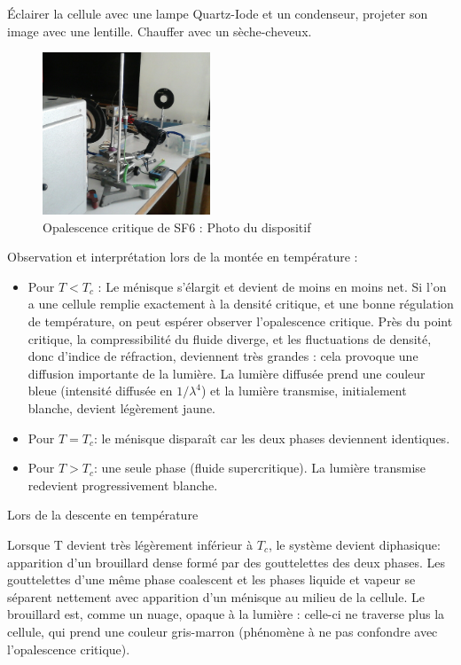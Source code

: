 \documentclass{article}%
\begin{document}
Éclairer la cellule avec une lampe Quartz-Iode et un condenseur, projeter son image avec une lentille. Chauffer avec un sèche-cheveux.
\begin{figure}
	\centerline{\includegraphics[width=5cm]{images-exp/opalescence_critique.jpg}}
	\caption{Opalescence critique de SF6 : Photo du dispositif}
\end{figure}

Observation et interprétation lors de la montée en température :

\begin{itemize}
	\item    Pour $T < T_{c}$ : Le ménisque s'élargit et devient de moins en moins net. Si l'on a une cellule remplie exactement à la densité critique, et une bonne régulation de température, on peut espérer observer l'opalescence critique. Près du point critique, la compressibilité du fluide diverge, et les fluctuations de densité, donc d'indice de réfraction, deviennent très grandes : cela provoque une diffusion importante de la lumière. La lumière diffusée prend une couleur bleue (intensité diffusée en $1/\lambda^{4}$) et la lumière transmise, initialement blanche, devient légèrement jaune.
	\item    Pour $T=T_{c}$: le ménisque disparaît car les deux phases deviennent identiques.
	\item    Pour $T > T_{c}$: une seule phase (fluide supercritique). La lumière transmise redevient progressivement blanche.
\end{itemize}

Lors de la descente en température

Lorsque T devient très légèrement inférieur à $T_{c}$, le système devient diphasique: apparition d'un brouillard dense formé par des gouttelettes des deux phases. Les gouttelettes d'une même phase coalescent et les phases liquide et vapeur se séparent nettement avec apparition d'un ménisque au milieu de la cellule. Le brouillard est, comme un nuage, opaque à la lumière : celle-ci ne traverse plus la cellule, qui prend une couleur gris-marron (phénomène à ne pas confondre avec l'opalescence critique).
\end{document}

